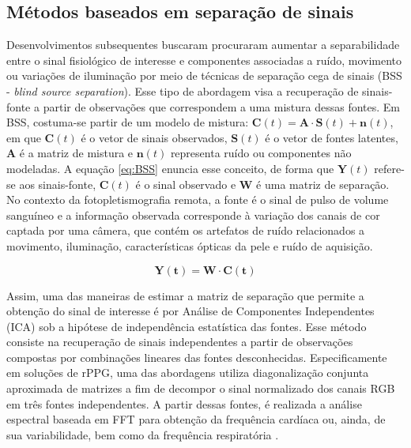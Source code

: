\subsection{Métodos baseados em separação de sinais}

Desenvolvimentos subsequentes buscaram procuraram aumentar a separabilidade entre o sinal fisiológico de interesse e componentes associadas a ruído, movimento ou variações de iluminação por meio de técnicas de separação cega de sinais (BSS - \textit{blind source separation}). Esse tipo de abordagem visa a recuperação de sinais-fonte a partir de observações que correspondem a uma mistura dessas fontes. Em BSS, costuma-se partir de um modelo de mistura: \(\bm{C}(t)=\bm{A} \cdot \bm{S}(t) + \bm{n}(t)\), em que \(\bm{C}(t)\) é o vetor de sinais observados, \(\bm{S}(t)\) é o vetor de fontes latentes, \(\bm{A}\) é a matriz de mistura e \(\bm{n}(t)\) representa ruído ou componentes não modeladas. A equação \ref{eq:BSS} enuncia esse conceito, de forma que \(\bm{Y}(t)\) refere-se aos sinais-fonte, \(\bm{C}(t)\) é o sinal observado e \(\bm{W}\) é uma matriz de separação. No contexto da fotopletismografia remota, a fonte é o sinal de pulso de volume sanguíneo e a informação observada corresponde à variação dos canais de cor captada por uma câmera, que contém os artefatos de ruído relacionados a movimento, iluminação, características ópticas da pele e ruído de aquisição.

\begin{equation}
    \label{eq:BSS}
    \bm{Y(t)} = \bm{W} \cdot \bm{C(t)}
\end{equation}

Assim, uma das maneiras de estimar a matriz de separação que permite a obtenção do sinal de interesse é por Análise de Componentes Independentes (ICA) sob a hipótese de independência estatística das fontes. Esse método consiste na recuperação de sinais independentes a partir de observações compostas por combinações lineares das fontes desconhecidas. Especificamente em soluções de rPPG, uma das abordagens utiliza diagonalização conjunta aproximada de matrizes \cite{cardoso1999high} a fim de decompor o sinal normalizado dos canais RGB em três fontes independentes. A partir dessas fontes, é realizada a análise espectral baseada em FFT para obtenção da frequência cardíaca \cite{poh2010non} ou, ainda, de sua variabilidade, bem como da frequência respiratória \cite{poh2010advancements}.  

